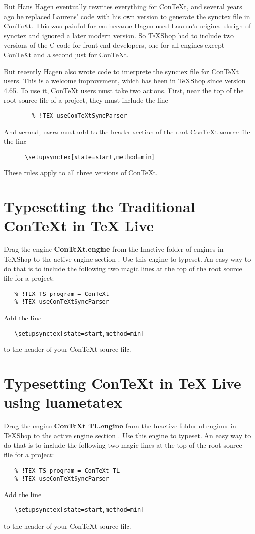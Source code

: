 \documentclass[11pt, oneside]{amsart}   	%
\begin{document}
But Hans Hagen eventually rewrites everything for ConTeXt, and several years ago he replaced Laurens' code with his own version to generate the synctex file in ConTeXt. This was painful for me because Hagen used Lauren's original design of synctex and ignored a later modern version. So TeXShop had to include two versions of the C code for front end developers, one for all engines except ConTeXt and a second just for ConTeXt. 

But recently Hagen also wrote code to interprete the synctex file for ConTeXt users. This is a welcome improvement, which has been in TeXShop since version 4.65. To use it, ConTeXt users must take two actions. First, near the top of the root source file of a project, they must include the line
\begin{verbatim}
        % !TEX useConTeXtSyncParser
\end{verbatim}
And second, users must add to the header section of the root ConTeXt source file the line
\begin{verbatim}
      \setupsynctex[state=start,method=min] 
\end{verbatim} 
These rules apply to all three versions of ConTeXt.

\section{Typesetting the Traditional ConTeXt in TeX Live}

Drag the engine {\bf ConTeXt.engine} from the Inactive folder of engines in TeXShop to the active engine section
. Use this engine to typeset. An easy way to do that is to include the following two magic lines at the top of the root source file for a project:
\begin{verbatim}
   % !TEX TS-program = ConTeXt
   % !TEX useConTeXtSyncParser
\end{verbatim}
Add the line
\begin{verbatim}
   \setupsynctex[state=start,method=min]    
\end{verbatim}
to the header of your ConTeXt source file.

\section{Typesetting ConTeXt in TeX Live using luametatex}

Drag the engine {\bf ConTeXt-TL.engine} from the Inactive folder of engines in TeXShop to the active engine section
. Use this engine to typeset. An easy way to do that is to include the following two magic lines at the top of the root source file for a project:
\begin{verbatim}
   % !TEX TS-program = ConTeXt-TL
   % !TEX useConTeXtSyncParser
\end{verbatim}
Add the line
\begin{verbatim}
   \setupsynctex[state=start,method=min]    
\end{verbatim}
to the header of your ConTeXt source file.
\end{document}
